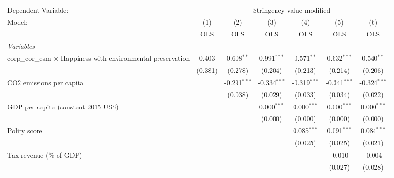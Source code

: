 
\begingroup
\centering
\begin{tabular}{lcccccc}
   \toprule
   Dependent Variable: & \multicolumn{6}{c}{Stringency value modified}\\
   Model:                                                               & (1)     & (2)            & (3)            & (4)            & (5)            & (6)\\  
                                                                        &  OLS    & OLS            & OLS            & OLS            & OLS            & OLS\\  
   \midrule
   \emph{Variables}\\
   corp\_cor\_esm $\times$ Happiness with environmental preservation    & 0.403   & 0.608$^{**}$   & 0.991$^{***}$  & 0.571$^{**}$   & 0.632$^{***}$  & 0.540$^{**}$\\   
                                                                        & (0.381) & (0.278)        & (0.204)        & (0.213)        & (0.214)        & (0.206)\\   
   CO2 emissions per capita                                             &         & -0.291$^{***}$ & -0.334$^{***}$ & -0.319$^{***}$ & -0.341$^{***}$ & -0.324$^{***}$\\   
                                                                        &         & (0.038)        & (0.029)        & (0.033)        & (0.034)        & (0.022)\\   
   GDP per capita (constant 2015 US\$)                                  &         &                & 0.000$^{***}$  & 0.000$^{***}$  & 0.000$^{***}$  & 0.000$^{***}$\\   
                                                                        &         &                & (0.000)        & (0.000)        & (0.000)        & (0.000)\\   
   Polity score                                                         &         &                &                & 0.085$^{***}$  & 0.091$^{***}$  & 0.084$^{***}$\\   
                                                                        &         &                &                & (0.025)        & (0.025)        & (0.021)\\   
   Tax revenue (\% of GDP)                                              &         &                &                &                & -0.010         & -0.004\\   
                                                                        &         &                &                &                & (0.027)        & (0.028)\\   

\end{tabular}
